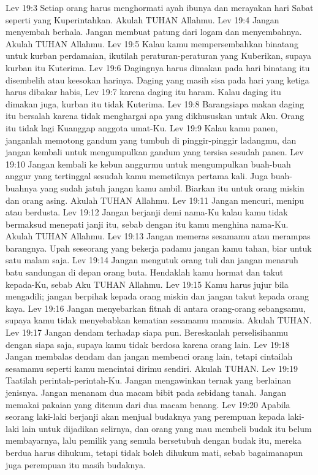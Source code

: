 Lev 19:3  Setiap orang harus menghormati ayah ibunya dan merayakan hari Sabat seperti yang Kuperintahkan. Akulah TUHAN Allahmu.
Lev 19:4  Jangan menyembah berhala. Jangan membuat patung dari logam dan menyembahnya. Akulah TUHAN Allahmu.
Lev 19:5  Kalau kamu mempersembahkan binatang untuk kurban perdamaian, ikutilah peraturan-peraturan yang Kuberikan, supaya kurban itu Kuterima.
Lev 19:6  Dagingnya harus dimakan pada hari binatang itu disembelih atau keesokan harinya. Daging yang masih sisa pada hari yang ketiga harus dibakar habis,
Lev 19:7  karena daging itu haram. Kalau daging itu dimakan juga, kurban itu tidak Kuterima.
Lev 19:8  Barangsiapa makan daging itu bersalah karena tidak menghargai apa yang dikhususkan untuk Aku. Orang itu tidak lagi Kuanggap anggota umat-Ku.
Lev 19:9  Kalau kamu panen, janganlah memotong gandum yang tumbuh di pinggir-pinggir ladangmu, dan jangan kembali untuk mengumpulkan gandum yang tersisa sesudah panen.
Lev 19:10  Jangan kembali ke kebun anggurmu untuk mengumpulkan buah-buah anggur yang tertinggal sesudah kamu memetiknya pertama kali. Juga buah-buahnya yang sudah jatuh jangan kamu ambil. Biarkan itu untuk orang miskin dan orang asing. Akulah TUHAN Allahmu.
Lev 19:11  Jangan mencuri, menipu atau berdusta.
Lev 19:12  Jangan berjanji demi nama-Ku kalau kamu tidak bermaksud menepati janji itu, sebab dengan itu kamu menghina nama-Ku. Akulah TUHAN Allahmu.
Lev 19:13  Jangan memeras sesamamu atau merampas barangnya. Upah seseorang yang bekerja padamu jangan kamu tahan, biar untuk satu malam saja.
Lev 19:14  Jangan mengutuk orang tuli dan jangan menaruh batu sandungan di depan orang buta. Hendaklah kamu hormat dan takut kepada-Ku, sebab Aku TUHAN Allahmu.
Lev 19:15  Kamu harus jujur bila mengadili; jangan berpihak kepada orang miskin dan jangan takut kepada orang kaya.
Lev 19:16  Jangan menyebarkan fitnah di antara orang-orang sebangsamu, supaya kamu tidak menyebabkan kematian sesamamu manusia. Akulah TUHAN.
Lev 19:17  Jangan dendam terhadap siapa pun. Bereskanlah perselisihanmu dengan siapa saja, supaya kamu tidak berdosa karena orang lain.
Lev 19:18  Jangan membalas dendam dan jangan membenci orang lain, tetapi cintailah sesamamu seperti kamu mencintai dirimu sendiri. Akulah TUHAN.
Lev 19:19  Taatilah perintah-perintah-Ku. Jangan mengawinkan ternak yang berlainan jenisnya. Jangan menanam dua macam bibit pada sebidang tanah. Jangan memakai pakaian yang ditenun dari dua macam benang.
Lev 19:20  Apabila seorang laki-laki berjanji akan menjual budaknya yang perempuan kepada laki-laki lain untuk dijadikan selirnya, dan orang yang mau membeli budak itu belum membayarnya, lalu pemilik yang semula bersetubuh dengan budak itu, mereka berdua harus dihukum, tetapi tidak boleh dihukum mati, sebab bagaimanapun juga perempuan itu masih budaknya.
